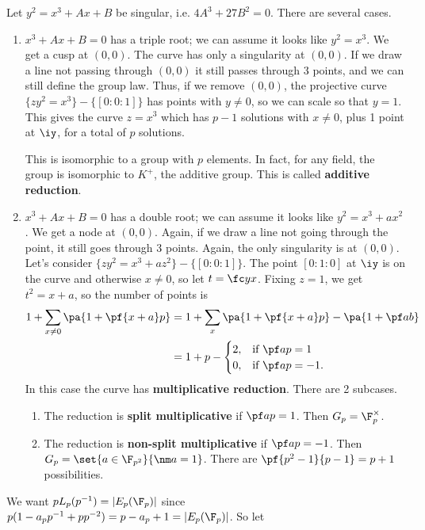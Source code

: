 Let $y^2=x^3+Ax+B$ be singular, i.e. $4A^3+27B^2=0$. There are several cases.
\begin{enumerate}
\item $x^3+Ax+B=0$ has a triple root; we can assume it looks like $y^2=x^3$. We get a cusp at $(0,0)$. The curve has only a singularity at $(0,0)$. If we draw a line not passing through $(0,0)$ it still passes through 3 points, and we can still define the group law. Thus, if we remove $(0,0)$, the projective curve $\{zy^2=x^3\}-\{[0:0:1]\}$ has points with $y\ne 0$, so we can scale so that $y=1$. This gives the curve $z=x^3$ which has $p-1$ solutions with $x\ne 0$, plus 1 point at $\iy$, for a total of $p$ solutions.

This is isomorphic to a group with $p$ elements. In fact, for any field, the group is isomorphic to $K^+$, the additive group. This is called \textbf{additive reduction}.
\item $x^3+Ax+B=0$ has a double root; we can assume it looks like $y^2=x^3+ax^2$. We get a node at $(0,0)$. Again, if we draw a line not going through the point, it still goes through 3 points. Again, the only singularity is at $(0,0)$. Let's consider $\{zy^2=x^3+az^2\}-\{[0:0:1]\}$. The point $[0:1:0]$ at $\iy$ is on the curve and otherwise $x\ne 0$, so let $t=\fc yx$. Fixing $z=1$, we get $t^2=x+a$, so the number of points is
\begin{align*}
1+\sum_{x\ne 0} \pa{1+\pf{x+a}p}
&=
1+\sum_{x}\pa{1+\pf{x+a}p}-\pa{1+\pf ab}\\
&=
1+p-\begin{cases}
2,&\text{if }\pf ap=1\\
0,&\text{if }\pf ap=-1.
\end{cases}
\end{align*}
In this case the curve has \textbf{multiplicative reduction}. 
There are 2 subcases.
\begin{enumerate}
\item
The reduction is \textbf{split multiplicative} if $\pf ap=1$. Then $G_p=\F_p^{\times}$.
\item
The reduction is \textbf{non-split multiplicative} if $\pf ap=-1$. Then $G_p=\set{a\in \F_{p^2}}{\nm a=1}$. There are $\pf{p^2-1}{p-1}=p+1$ possibilities.
\end{enumerate}
\end{enumerate}
We want $pL_p(p^{-1})=|E_p(\F_p)|$ since $p(1-a_pp^{-1}+pp^{-2})=p-a_p+1=|E_p(\F_p)|$. So let
